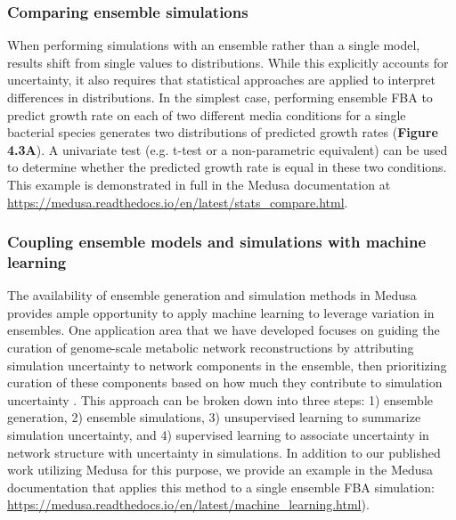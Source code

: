 \documentclass[11pt,twocolumn,notitlepage,openany,twoside]{book}
\begin{document}
\begin{refsection}
\subsubsection{Comparing ensemble simulations}

When performing simulations with an ensemble rather than a single model, results shift from single values to distributions. While this explicitly accounts for uncertainty, it also requires that statistical approaches are applied to interpret differences in distributions. In the simplest case, performing ensemble FBA to predict growth rate on each of two different media conditions for a single bacterial species generates two distributions of predicted growth rates (\textbf{Figure 4.3A}). A univariate test (e.g. t-test or a non-parametric equivalent) can be used to determine whether the predicted growth rate is equal in these two conditions. This example is demonstrated in full in the Medusa documentation at \url{https://medusa.readthedocs.io/en/latest/stats_compare.html}.

\subsubsection{Coupling ensemble models and simulations with machine learning}

The availability of ensemble generation and simulation methods in Medusa provides ample opportunity to apply machine learning to leverage variation in ensembles. One application area that we have developed focuses on guiding the curation of genome-scale metabolic network reconstructions by attributing simulation uncertainty to network components in the ensemble, then prioritizing curation of these components based on how much they contribute to simulation uncertainty \cite{Medlock2018-kx}. This approach can be broken down into three steps: 1) ensemble generation, 2) ensemble simulations, 3) unsupervised learning to summarize simulation uncertainty, and 4) supervised learning to associate uncertainty in network structure with uncertainty in simulations. In addition to our published work utilizing Medusa for this purpose, we provide an example in the Medusa documentation that applies this method to a single ensemble FBA simulation: \url{https://medusa.readthedocs.io/en/latest/machine_learning.html}).


\end{refsection}
\end{document}
